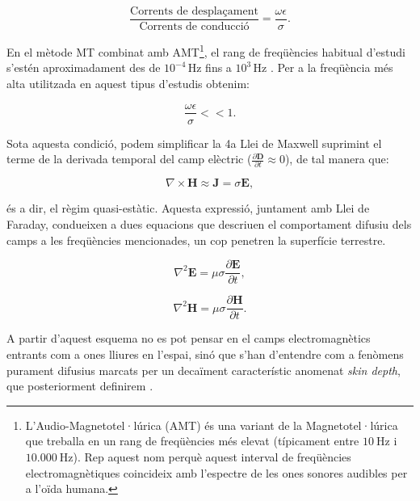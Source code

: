 \documentclass[11pt,a4paper,oneside]{article}
\begin{document}
\begin{equation}
    \frac{\text{Corrents de desplaçament}}{\text{Corrents de conducció}} = \frac{\omega \epsilon}{\sigma}.
    \label{eq:3}
\end{equation}

\vspace{5pt}
En el mètode MT combinat amb AMT\footnote{L'Audio-Magnetotel·lúrica (AMT) és una variant de la Magnetotel·lúrica que treballa en un rang de freqüències més elevat (típicament entre $10~\text{Hz}$ i $10.000~\text{Hz}$). Rep aquest nom perquè aquest interval de freqüències electromagnètiques coincideix amb l'espectre de les ones sonores audibles per a l'oïda humana.}, el rang de freqüències habitual d'estudi s'estén aproximadament des de $10^{-4} \, \text{Hz}$ fins a $10^3 \, \text{Hz}$ \citep{chavejones2012}. 
Per a la freqüència més alta utilitzada en aquest tipus d'estudis obtenim:
\vspace{5pt}

\begin{equation}
    \frac{\omega \epsilon}{\sigma} << 1.
    \label{eq:4}
\end{equation}

\vspace{5pt}
Sota aquesta condició, podem simplificar la 4a Llei de Maxwell suprimint el terme de la derivada temporal del camp elèctric ($\frac{\partial \mathbf{D}}{\partial t} \approx 0$), de tal manera que:

\begin{equation}
    \nabla \times \mathbf{H} \approx \mathbf{J} = \sigma \mathbf{E},
    \label{eq:5}
\end{equation}


\noindent
és a dir, el règim quasi-estàtic. Aquesta expressió, juntament amb Llei de Faraday, condueixen a dues equacions que descriuen el comportament difusiu dels camps a les freqüències mencionades, un cop penetren la superfície terrestre.
\vspace{5pt}

\begin{equation}
    \nabla^2 \mathbf{E} = \mu \sigma \frac{\partial \mathbf{E}}{\partial t},
    \label{eq:6}
\end{equation}

\begin{equation}
    \nabla^2 \mathbf{H} = \mu \sigma \frac{\partial \mathbf{H}}{\partial t}.
    \label{eq:7}
\end{equation}

\vspace{5pt}
A partir d’aquest esquema no es pot pensar en el camps electromagnètics entrants com a ones lliures en l’espai, sinó que s’han d’entendre com a fenòmens purament difusius marcats per un decaïment característic anomenat \emph{skin depth}, que posteriorment definirem \citep{weidelt1972}.
\end{document}
